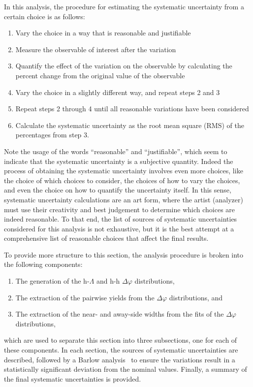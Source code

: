 In this analysis, the procedure for estimating the systematic uncertainty from a certain choice is as follows:
%
\begin{enumerate}
    \item Vary the choice in a way that is reasonable and justifiable 
    \item Measure the observable of interest after the variation
    \item Quantify the effect of the variation on the observable by calculating the percent change from the original value of the observable
    \item Vary the choice in a slightly different way, and repeat steps 2 and 3
    \item Repeat steps 2 through 4 until all reasonable variations have been considered
    \item Calculate the systematic uncertainty as the root mean square (RMS) of the percentages from step 3.
\end{enumerate}
%
Note the usage of the words ``reasonable'' and ``justifiable'', which seem to indicate that the systematic uncertainty is a subjective quantity. Indeed the process of obtaining the systematic uncertainty involves even more choices, like the choice of which choices to consider, the choices of how to vary the choices, and even the choice on how to quantify the uncertainty itself. In this sense, systematic uncertainty calculations are an art form, where the artist (analyzer) must use their creativity and best judgement to determine which choices are indeed reasonable. To that end, the list of sources of systematic uncertainties considered for this analysis is not exhaustive, but it is the best attempt at a comprehensive list of reasonable choices that affect the final results. 

To provide more structure to this section, the analysis procedure is broken into the following components:
%
\begin{enumerate}
\item The generation of the h-$\Lambda$ and h-h $\Delta\varphi$ distributions,
\item The extraction of the pairwise yields from the $\Delta\varphi$ distributions, and 
\item The extraction of the near- and away-side widths from the fits of the $\Delta\varphi$ distributions,
\end{enumerate}
%
which are used to separate this section into three subsections, one for each of these components. In each section, the sources of systematic uncertainties are described, followed by a Barlow analysis~\cite{BarlowCheck} to ensure the variations result in a statistically significant deviation from the nominal values. Finally, a summary of the final systematic uncertainties is provided.

